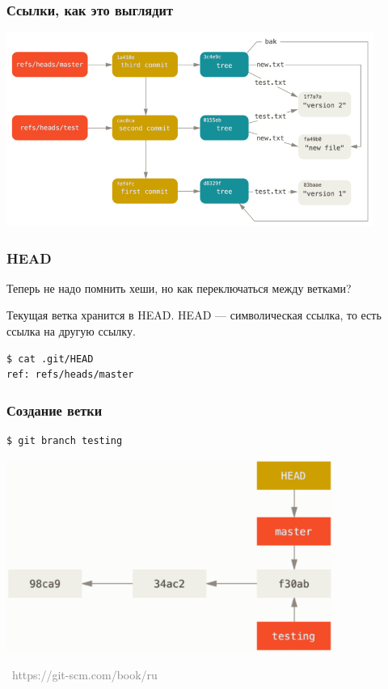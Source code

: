 \documentclass[xetex,mathserif,serif]{beamer}
\newcommand{\attribution}[1] {
\vspace{-5mm}\begin{flushright}\begin{scriptsize}\textcolor{gray}{\textcopyright\, #1}\end{scriptsize}\end{flushright}
}
\begin{document}
	\begin{frame}
		\frametitle{Ссылки, как это выглядит}
		\begin{center}
			\includegraphics[width=0.9\textwidth]{gitRefs.png}
		\end{center}
	\end{frame}

	\begin{frame}[fragile]
		\frametitle{HEAD}
		Теперь не надо помнить хеши, но как переключаться между ветками?

		Текущая ветка хранится в HEAD. HEAD --- символическая ссылка, то есть ссылка на другую ссылку.
		\begin{verbatim}
$ cat .git/HEAD
ref: refs/heads/master
		\end{verbatim}
	\end{frame}

	\begin{frame}[fragile]
		\frametitle{Создание ветки}
		\begin{verbatim}
$ git branch testing
		\end{verbatim}
		\begin{center}
			\includegraphics[width=0.8\textwidth]{creatingBranch.png}
			\attribution{https://git-scm.com/book/ru}
		\end{center}
	\end{frame}
\end{document}
